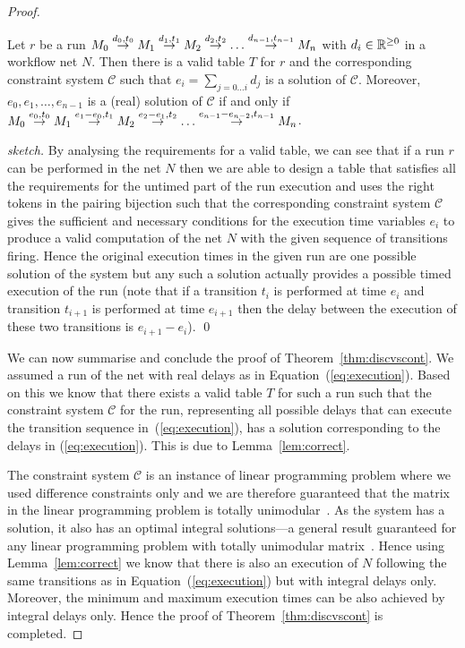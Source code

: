 \begin{proof}
\begin{lemma} \label{lem:correct}
Let $r$ be a run $M_0 \stackrel{d_0,t_0}{\rightarrow} M_1 \stackrel{d_1,t_1}{\rightarrow} M_2 \stackrel{d_2,t_2}{\rightarrow} 
\ldots \stackrel{d_{n-1},t_{n-1}}{\rightarrow} M_{n}$ with $d_i \in \mathbb{R}^{\geq 0}$ in a workflow
net $N$. Then there is a valid table $T$ for $r$
and the corresponding constraint system $\mathscr{C}$ such that
$e_i= \sum_{j=0 \ldots i} d_j$ is a solution of $\mathscr{C}$. 
Moreover, $e_0, e_1, \ldots, e_{n-1}$ is a (real) solution of 
$\mathscr{C}$ if and only if
$M_0 \stackrel{e_0,t_0}{\rightarrow} M_1 \stackrel{e_1-e_0,t_1}{\rightarrow} M_2 \stackrel{e_2-e_1,t_2}{\rightarrow} 
\ldots \stackrel{e_{n-1}-e_{n-2},t_{n-1}}{\rightarrow} M_{n}$.
\end{lemma}
\begin{proof}[sketch]
By analysing the requirements for a valid table, we can see that if
a run $r$ can be performed in the net $N$ then we are able to 
design a table that satisfies all the requirements for the untimed
part of the run execution and uses the right tokens in the pairing
bijection such that the corresponding constraint system $\mathscr{C}$
gives the sufficient and necessary
conditions for the execution time variables $e_i$ to produce a valid
computation of the net $N$ with the given sequence of transitions firing. 
Hence the original execution times in the given run are one possible solution of 
the system but any such a solution actually provides a possible
timed execution of the run (note that if a transition $t_i$ is performed 
at time $e_i$ and transition $t_{i+1}$ is performed at time $e_{i+1}$ then
the delay between the execution of these two transitions is $e_{i+1}-e_{i}$).
\qed
\end{proof}

We can now summarise and conclude the proof of Theorem~\ref{thm:discvscont}. 
We assumed a run of the net with real delays as in Equation~(\ref{eq:execution}).
Based on this we know that there exists a valid table $T$ for such a run such that 
the constraint system $\mathscr{C}$ for the run, representing all possible 
delays that can execute the transition sequence in~(\ref{eq:execution}), has
a solution corresponding to the delays in (\ref{eq:execution}). This is due
to Lemma~\ref{lem:correct}. 

The constraint system $\mathscr{C}$ is an instance of linear programming 
problem where we used difference constraints only and we are therefore 
guaranteed that the matrix in the linear programming problem is totally
unimodular~\cite{umodmatrix1}. As the system has a solution, it also
has an optimal integral solutions---a general result guaranteed
for any linear programming problem with totally unimodular 
matrix~\cite{umodmatrix2}.
Hence using Lemma~\ref{lem:correct} we know that there is also an execution
of $N$ following the same transitions as in Equation~(\ref{eq:execution})
but with integral delays only. Moreover, the minimum and maximum
execution times can be also achieved by integral delays only. Hence
the proof of Theorem~\ref{thm:discvscont} is completed.

\end{proof}

